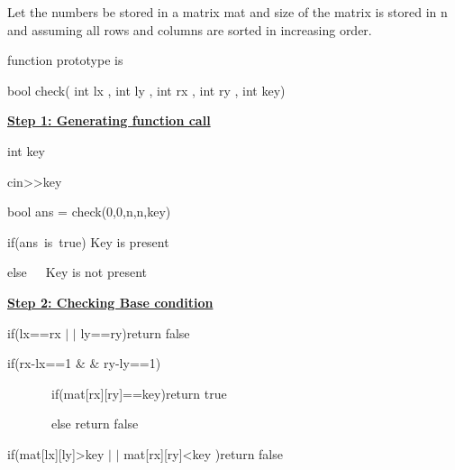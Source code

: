 \documentclass[14pt]{article}
\renewcommand{\_}{\kern-1.5pt\textunderscore\kern-1.5pt}
\begin{document}
\begin{multicols}{2}
\begin{enumerate}
\vspace{\baselineskip}
\begin{justify}
Let the numbers be stored in a matrix mat and size of the matrix is stored in n and assuming all rows and columns are sorted in increasing order.
\end{justify}
\begin{justify}
function prototype is
\end{justify}
\begin{justify}
bool check( int lx , int ly , int rx , int ry , int key)
\end{justify}

\vspace{\baselineskip}
\begin{justify}
\textbf{\uline{Step 1: Generating function call}} 
\end{justify}

\vspace{\baselineskip}
\begin{justify}
int key
\end{justify}
\begin{justify}
cin>>key
\end{justify}
\begin{justify}
bool ans = check(0,0,n,n,key)
\end{justify}
\begin{justify}
if(ans\ is\ true)   Key is present
\end{justify}
\begin{justify}
else\ \ \  Key is not present
\end{justify}

\vspace{\baselineskip}

\vspace{\baselineskip}
\begin{justify}
\textbf{\uline{Step 2: Checking Base condition}} 
\end{justify}

\vspace{\baselineskip}
\begin{justify}
if(lx==rx $ \vert $ $ \vert $  ly==ry)return false
\end{justify}
\begin{justify}
if(rx-lx==1 $\&$ $\&$  ry-ly==1)
\end{justify}
\begin{justify}
\ \ \ \ \ \ \  if(mat[rx][ry]==key)return true
\end{justify}
\begin{justify}
\ \ \ \ \ \ \  else return false
\end{justify}
\begin{justify}
if(mat[lx][ly]>key $ \vert $ $ \vert $  mat[rx][ry]<key )return false
\end{justify}


\end{enumerate}
\end{multicols}
\end{document}

